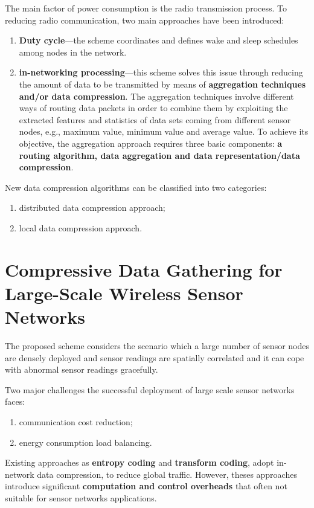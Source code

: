 The main factor of power consumption is the radio transmission process. To reducing radio communication, two main approaches have been introduced:
\begin{enumerate}
    \item \textbf{\textcolor[rgb]{1,0,0}{Duty cycle}}---the scheme coordinates and defines wake and sleep schedules among nodes in the network.
    \item \textbf{\textcolor[rgb]{1,0,0}{in-networking processing}}---this scheme solves this issue through reducing the amount of data to be transmitted by means of \textbf{\textcolor[rgb]{1,0,0}{aggregation techniques and/or data compression}}. The aggregation techniques involve different ways of routing data packets in order to combine them by exploiting the extracted features and statistics of data sets coming from different sensor nodes, e.g., maximum value, minimum value and average value. To achieve its objective, the aggregation approach requires three basic components: \textbf{\textcolor[rgb]{1,0,0}{a routing algorithm, data aggregation and data representation/data compression}}.
\end{enumerate}

New data compression algorithms can be classified into two categories:
\begin{enumerate}
    \item distributed data compression approach;
    \item local data compression approach.
\end{enumerate}


\section{Compressive Data Gathering for Large-Scale Wireless Sensor Networks}
\label{sec1.3}
The proposed scheme considers the scenario which a large number of sensor nodes are densely deployed and sensor readings are spatially correlated and it can cope with abnormal sensor readings gracefully.

Two major challenges the successful deployment of large scale sensor networks faces:
\begin{enumerate}
    \item communication cost reduction;
    \item energy consumption load balancing.
\end{enumerate}
Existing approaches as \textbf{\textcolor[rgb]{1,0,0}{entropy coding}} and \textbf{\textcolor[rgb]{1,0,0}{transform coding}}, adopt in-network data compression, to reduce global traffic. However, theses approaches introduce significant \textbf{\textcolor[rgb]{0,0,1}{computation and control overheads}} that often not suitable for sensor networks applications.

